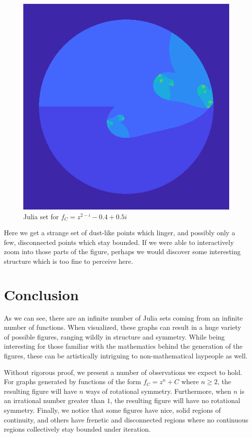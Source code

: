 \documentclass[12pt]{article}
\begin{document}
\begin{figure}[H]
	\centering
	\includegraphics[scale=0.5]{complexPow.png}
	\caption{Julia set for $f_C = z^{2 - i} - 0.4 + 0.5i$}
\end{figure}

Here we get a strange set of dust-like points which linger, and possibly only a few, disconnected points which stay bounded. If we were able to interactively zoom into those parts of the figure, perhaps we would discover some interesting structure which is too fine to perceive here. 

\section{Conclusion}

As we can see, there are an infinite number of Julia sets coming from an infinite number of functions. When visualized, these graphs can result in a huge variety of possible figures, ranging wildly in structure and symmetry. While being interesting for those familiar with the mathematics behind the generation of the figures, these can be artistically intriguing to non-mathematical laypeople as well. 

Without rigorous proof, we present a number of observations we expect to hold. For graphs generated by functions of the form $f_C = z^n + C$ where $n\geq 2$, the resulting figure will have $n$ ways of rotational symmetry. Furthermore, when $n$ is an irrational number greater than $1$, the resulting figure will have no rotational symmetry. Finally, we notice that some figures have nice, solid regions of continuity, and others have frenetic and disconnected regions where no continuous regions collectively stay bounded under iteration. 
\end{document}
